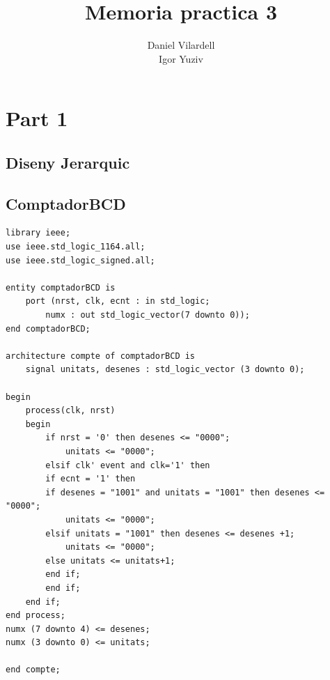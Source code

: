 \documentclass[12pt, a4papre]{article}
\author{Daniel Vilardell\\
	   Igor Yuziv}
\title{Memoria practica 3}
\date{}
\begin{document}
	\maketitle
	\tableofcontents

	
	\newpage
	\section{Part 1}
	\subsection{Diseny Jerarquic}
	
	\subsection{ComptadorBCD}
	
		\begin{lstlisting}[style=vhdl, frame=single, basicstyle=\tiny]
		library ieee;
use ieee.std_logic_1164.all;
use ieee.std_logic_signed.all;

entity comptadorBCD is
	port (nrst, clk, ecnt : in std_logic;
		numx : out std_logic_vector(7 downto 0));
end comptadorBCD;

architecture compte of comptadorBCD is 
	signal unitats, desenes : std_logic_vector (3 downto 0);
	
begin 
	process(clk, nrst)
	begin
	    if nrst = '0' then desenes <= "0000";
			unitats <= "0000";
	    elsif clk' event and clk='1' then
		if ecnt = '1' then
		if desenes = "1001" and unitats = "1001" then desenes <= "0000";
			unitats <= "0000";
		elsif unitats = "1001" then desenes <= desenes +1;
			unitats <= "0000";
		else unitats <= unitats+1;
		end if;
	    end if;
	end if;
end process;
numx (7 downto 4) <= desenes;
numx (3 downto 0) <= unitats;

end compte;
		
		\end{lstlisting}
		
\end{document}
